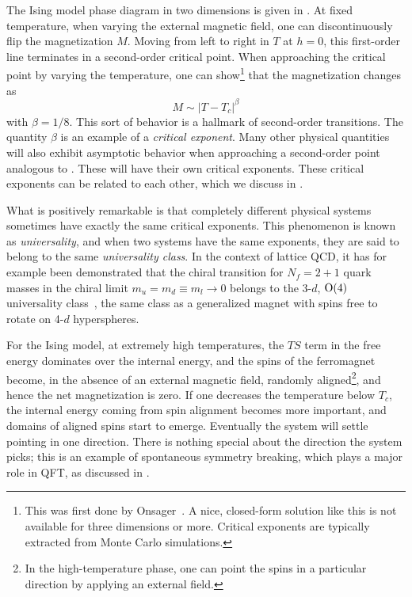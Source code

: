 The Ising model phase diagram in two dimensions is given 
in .
At fixed temperature, when varying the external magnetic field, one can
discontinuously flip the magnetization $M$. Moving from left to right in $T$
at $h=0$, this first-order line terminates
in a second-order critical point. When
approaching the critical point by varying the temperature, one can
show\footnote{This was first done by Onsager~\cite{onsager_crystal_1944}. A
nice, closed-form solution like this is not available for three dimensions or
more. Critical exponents are typically extracted from Monte Carlo simulations.}
that the magnetization changes as
\begin{equation}\label{eq:exampleCP}
  M\sim|T-T_c|^\beta
\end{equation}
with $\beta=1/8$. This sort of behavior is a hallmark of second-order
transitions. The quantity $\beta$ is an example of a {\it critical
exponent}. 
Many other physical quantities will also exhibit asymptotic behavior when
approaching a second-order point analogous to .
These will have their own critical exponents. These
critical exponents can be related to each other, which we discuss
in .

What is positively remarkable is that completely different
physical systems sometimes have exactly the same critical exponents.
This phenomenon is known as {\it universality}, and when two
systems have the same exponents, they are said to belong to the same {\it
universality class}. In the context of lattice QCD,
it has for example been demonstrated that the chiral transition for $N_f=2+1$
quark masses in the chiral limit $m_u=m_d\equiv m_l\to0$ belongs to the 3-$d$, 
$\operatorname{\text{O}}(4)$ universality class~\cite{ding_chiral_2019}, 
the same class as a generalized magnet with spins
free to rotate on 4-$d$ hyperspheres.

For the Ising model, at extremely high temperatures, 
the $TS$ term in the free energy dominates over
the internal energy, and the spins of the ferromagnet become, in the absence of
an external magnetic field, randomly aligned\footnote{In the high-temperature
phase, one can point the spins in a particular direction by applying an external
field.}, and hence the net magnetization is zero. If one decreases the
temperature below $T_c$, the internal energy coming from spin alignment becomes
more important, and domains of aligned spins start to emerge. Eventually the
system will settle pointing in one direction. There is nothing special about the
direction the system picks; this is an example of spontaneous symmetry
breaking, which plays a major role in QFT,
as discussed in . 


